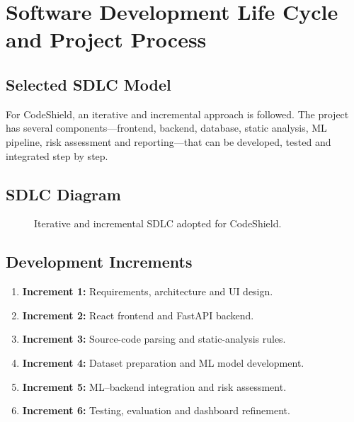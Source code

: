 \documentclass[12pt,a4paper]{report}
\begin{document}
\chapter{Software Development Life Cycle and Project Process}

\section{Selected SDLC Model}
For CodeShield, an iterative and incremental approach is followed. The project has several components---frontend, backend, database, static analysis, ML pipeline, risk assessment and reporting---that can be developed, tested and integrated step by step.

\section{SDLC Diagram}
\begin{figure}[H]
\centering
{}
\caption{Iterative and incremental SDLC adopted for CodeShield.}
\end{figure}

\section{Development Increments}
\begin{enumerate}[noitemsep]
  \item \textbf{Increment 1:} Requirements, architecture and UI design.
  \item \textbf{Increment 2:} React frontend and FastAPI backend.
  \item \textbf{Increment 3:} Source-code parsing and static-analysis rules.
  \item \textbf{Increment 4:} Dataset preparation and ML model development.
  \item \textbf{Increment 5:} ML--backend integration and risk assessment.
  \item \textbf{Increment 6:} Testing, evaluation and dashboard refinement.
\end{enumerate}
\end{document}
